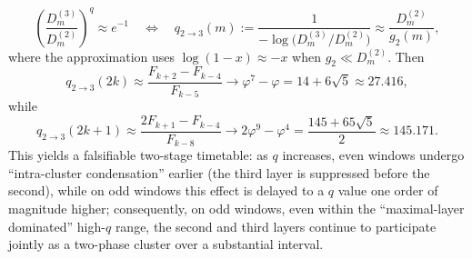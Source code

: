 \begin{remark}
\[
\left(\frac{D_m^{(3)}}{D_m^{(2)}}\right)^q\approx e^{-1}
\quad\Longleftrightarrow\quad
q_{2\to3}(m):=\frac{1}{-\log\!\bigl(D_m^{(3)}/D_m^{(2)}\bigr)}
\approx \frac{D_m^{(2)}}{g_2(m)},
\]
where the approximation uses \(\log(1-x)\approx -x\) when \(g_2\ll D_m^{(2)}\).
Then
\[
q_{2\to3}(2k)\approx \frac{F_{k+2}-F_{k-4}}{F_{k-5}}
\longrightarrow \varphi^7-\varphi=14+6\sqrt5\approx 27.416,
\]
while
\[
q_{2\to3}(2k+1)\approx \frac{2F_{k+1}-F_{k-4}}{F_{k-8}}
\longrightarrow 2\varphi^9-\varphi^4=\frac{145+65\sqrt5}{2}\approx 145.171.
\]
This yields a falsifiable two-stage timetable: as \(q\) increases, even windows undergo ``intra-cluster condensation'' earlier (the third layer is suppressed before the second), while on odd windows this effect is delayed to a \(q\) value one order of magnitude higher; consequently, on odd windows, even within the ``maximal-layer dominated'' high-\(q\) range, the second and third layers continue to participate jointly as a two-phase cluster over a substantial interval.
\end{remark}


